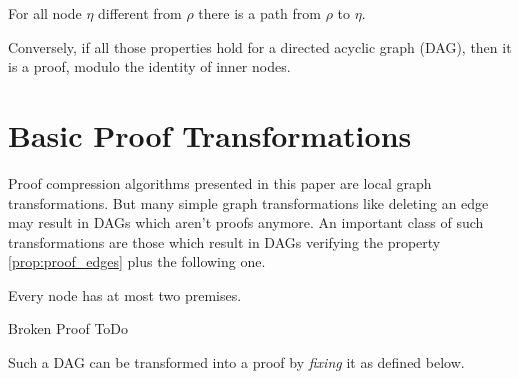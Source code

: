 \documentclass{llncs}
\begin{document}
\begin{property}
For all node $\eta$ different from $\rho$ there is a path from $\rho$ to $\eta$.
\end{property}

Conversely, if all those properties hold for a directed acyclic graph (DAG), then it is a proof,
modulo the identity of inner nodes.

\section{Basic Proof Transformations}




Proof compression algorithms presented in this paper are local graph transformations.  But many
simple graph transformations like deleting an edge may result in DAGs which aren't proofs anymore.
An important class of such transformations are those which result in DAGs verifying the property
\ref{prop:proof_edges} plus the following one.

\begin{property}
\label{prop:pseudo-proof}
Every node has at most two premises.
\end{property}

\begin{definition}{Broken Proof}
ToDo

\end{definition}


Such a DAG can be transformed into a proof by \emph{fixing} it as defined below.
\end{document}
